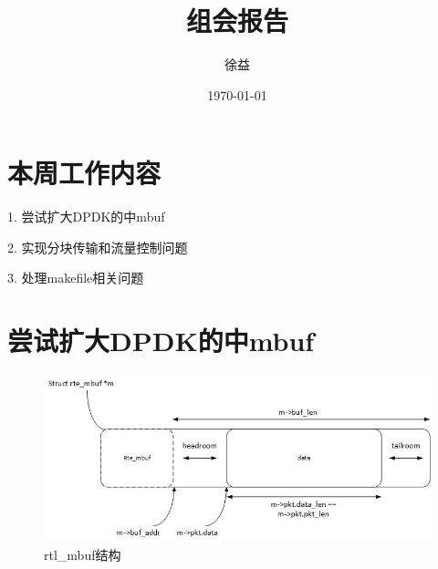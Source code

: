 \documentclass{article}
\title{组会报告}
\author{徐益}
\date{\today}
\begin{document}
	
\maketitle


\section{本周工作内容}

1. 尝试扩大DPDK的中mbuf

2. 实现分块传输和流量控制问题

3. 处理makefile相关问题

\section{尝试扩大DPDK的中mbuf}
\begin{figure}[H]
	\centering
	\includegraphics[width = .8\textwidth]{structure_mbuf.jpg}
	\caption{rtl\_mbuf结构}
\end{figure}
\lstset{language=C++}
\end{document}
